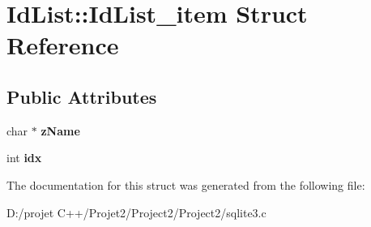 \hypertarget{struct_id_list_1_1_id_list__item}{}\section{Id\+List\+:\+:Id\+List\+\_\+item Struct Reference}
\label{struct_id_list_1_1_id_list__item}
\subsection*{Public Attributes}
\begin{DoxyCompactItemize}
\item 
\mbox{\label{struct_id_list_1_1_id_list__item_acd44e1182dc46441939cd6a5d935724c}} 
char $\ast$ {\bfseries z\+Name}
\item 
\mbox{\label{struct_id_list_1_1_id_list__item_a869d1a5ee03bcb018e38fae6c9ac0572}} 
int {\bfseries idx}
\end{DoxyCompactItemize}


The documentation for this struct was generated from the following file\+:\begin{DoxyCompactItemize}
\item 
D\+:/projet C++/\+Projet2/\+Project2/\+Project2/sqlite3.\+c\end{DoxyCompactItemize}
